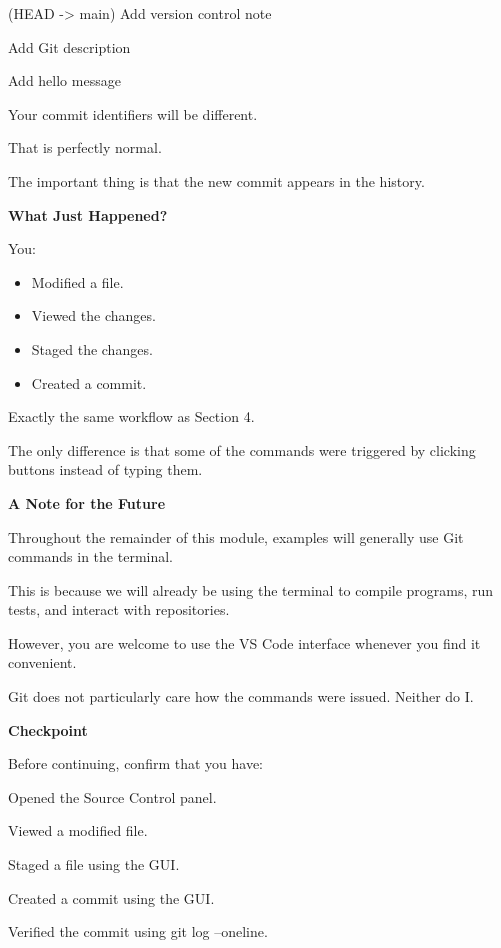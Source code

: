 \documentclass{csc2059practical}
\begin{document}
\begin{terminalplain}
  (HEAD -> main) Add version control note
  
  Add Git description
  
  Add hello message
\end{terminalplain}
  
Your commit identifiers will be different.

That is perfectly normal.

The important thing is that the new commit appears in the history.
\begin{reflectionbox}
  
  \textbf{What Just Happened?}\par
  \medskip
  You:
  
  \begin{itemize}
    \item Modified a file.
    \item Viewed the changes.
    \item Staged the changes.
    \item Created a commit.
  \end{itemize}
  Exactly the same workflow as Section 4.
  
  The only difference is that some of the commands were triggered by clicking buttons instead of typing them.
\end{reflectionbox}
  
\clearpage
\begin{importantnote}

  \textbf{A Note for the Future}\par
  \medskip
  Throughout the remainder of this module, examples will generally use Git commands in the terminal.
  
  This is because we will already be using the terminal to compile programs, run tests, and interact with repositories.
  
  However, you are welcome to use the VS Code interface whenever you find it convenient.
  
  Git does not particularly care how the commands were issued. Neither do I.
\end{importantnote}

\begin{reflectionbox}
\textbf{Checkpoint}\par
\medskip

Before continuing, confirm that you have:


Opened the Source Control panel.


Viewed a modified file.


Staged a file using the GUI.


Created a commit using the GUI.


Verified the commit using git log --oneline.


\end{reflectionbox}
\end{document}
